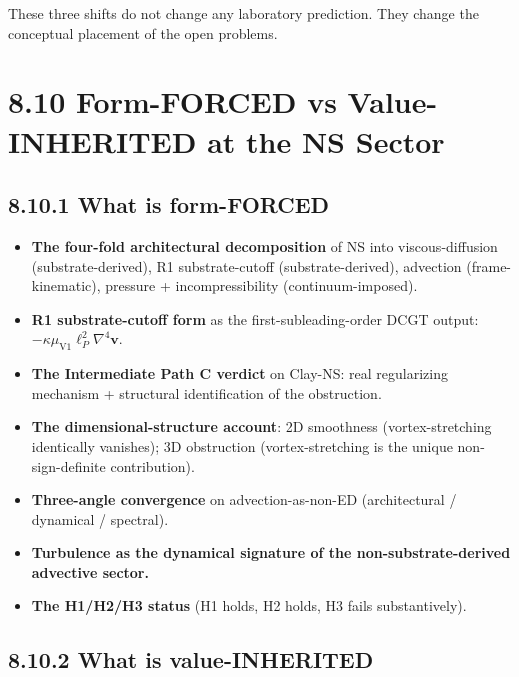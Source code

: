 \documentclass[11pt]{book}
\begin{document}
These three shifts do not change any laboratory prediction. They change the conceptual placement of the open problems.

\section{8.10 Form-FORCED vs Value-INHERITED at the NS Sector}

\subsection{8.10.1 What is form-FORCED}

\begin{itemize}
\item \textbf{The four-fold architectural decomposition} of NS into viscous-diffusion (substrate-derived), R1 substrate-cutoff (substrate-derived), advection (frame-kinematic), pressure + incompressibility (continuum-imposed).
\item \textbf{R1 substrate-cutoff form} as the first-subleading-order DCGT output: $-\kappa\mu_{\mathrm{V1}}\ell_P^2\nabla^4\mathbf{v}$.
\item \textbf{The Intermediate Path C verdict} on Clay-NS: real regularizing mechanism + structural identification of the obstruction.
\item \textbf{The dimensional-structure account}: 2D smoothness (vortex-stretching identically vanishes); 3D obstruction (vortex-stretching is the unique non-sign-definite contribution).
\item \textbf{Three-angle convergence} on advection-as-non-ED (architectural / dynamical / spectral).
\item \textbf{Turbulence as the dynamical signature of the non-substrate-derived advective sector.}
\item \textbf{The H1/H2/H3 status} (H1 holds, H2 holds, H3 fails substantively).
\end{itemize}

\subsection{8.10.2 What is value-INHERITED}
\end{document}
